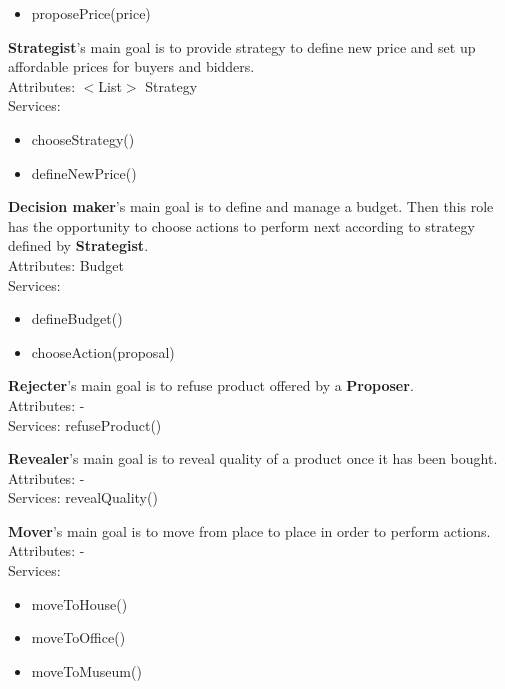 \documentclass[a4paper,11pt]{report}
\begin{document}
\begin{multicols}{2}
\begin{mdframed}
\begin{itemize}
   \item proposePrice(price)
  \end{itemize}
  \end{mdframed}
  \begin{mdframed}
  \textbf{Strategist}'s main goal is to provide strategy to define new price and set up affordable 
  prices for buyers and bidders.\\
  Attributes: $<$List$>$ Strategy\\
  Services:\vspace{-5pt}
  \begin{itemize}
    \itemsep0pt
    \item chooseStrategy()
    \item defineNewPrice()
  \end{itemize}
  \end{mdframed}
  \begin{mdframed}
  \textbf{Decision maker}'s main goal is to define and manage a budget. Then this 
  role has the opportunity to choose actions to perform next according to strategy 
  defined by \textbf{Strategist}.\\
  Attributes: Budget\\
  Services:\vspace{-5pt}
  \begin{itemize}
    \itemsep0pt
    \item defineBudget()
    \item chooseAction(proposal)
  \end{itemize}
  \end{mdframed}
  \begin{mdframed}
  \textbf{Rejecter}'s main goal is to refuse product offered by a \textbf{Proposer}.\\
  Attributes: -\\
  Services: refuseProduct()
  \end{mdframed}
  \begin{mdframed}
  \textbf{Revealer}'s main goal is to reveal quality of a product once it has been bought.\\
  Attributes: -\\
  Services: revealQuality()
  \end{mdframed}
  \begin{mdframed}
  \textbf{Mover}'s main goal is to move from place to place in order to perform actions.\\
  Attributes: -\\
  Services:\vspace{-10pt}
  \begin{itemize}
    \itemsep0pt
    \item moveToHouse()
    \item moveToOffice()
    \item moveToMuseum()
  \end{itemize}
  \end{mdframed}
  
  \end{multicols}
  
\end{document}
